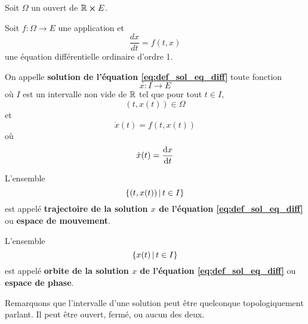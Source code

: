 \documentclass[a4paper, 11pt]{report}
\begin{document}
	\begin{definition} 
		Soit $\Omega$ un ouvert de $\mathbb{R} \cross E$.

		Soit $f : \Omega \rightarrow E$ une application et
		\begin{equation}
			\label{eq:def_sol_eq_diff}
			\frac{dx}{dt} = f(t, x)
		\end{equation}
		une équation différentielle ordinaire d'ordre 1.

		On appelle \textbf{solution de l'équation \ref{eq:def_sol_eq_diff}} toute
		fonction
		\begin{equation}
			x : I \rightarrow E
		\end{equation}
		où $I$ est un intervalle non vide de $\mathbb{R}$
		tel que pour tout $t \in I$,
		\begin{equation}
			(t, x(t)) \in \Omega
		\end{equation}
		et
		\begin{equation}
			\dot{x}(t) = f(t, x(t))
		\end{equation}
		où
		\begin{equation}
			\dot{x}(t) = \dv{x}{t}
		\end{equation}

		L'ensemble
		\begin{equation}
			\left\{(t, x(t)) \, | \, t \in I \right\}
		\end{equation}
		est appelé \textbf{trajectoire de la solution $x$ de
		l'équation \ref{eq:def_sol_eq_diff}} ou \textbf{espace de mouvement}.

		L'ensemble
		\begin{equation}
			\left\{x(t) \, | \, t \in I \right\}
		\end{equation}
		est appelé \textbf{orbite de la solution $x$ de
		l'équation \ref{eq:def_sol_eq_diff}} ou \textbf{espace de phase}.
	\end{definition}

	Remarquons que l'intervalle d'une solution peut être quelconque
	topologiquement parlant. Il peut être ouvert, fermé, ou aucun des deux.
\end{document}
